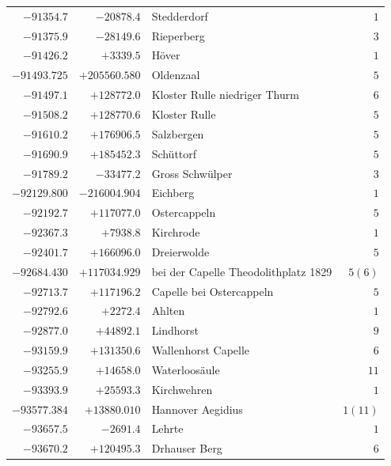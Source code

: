 \begin{center}
\begin{tabular}{r|r|p{170pt}|r}
\(-91354.7\)&\(-20878.4\)&Stedderdorf&\(1\)\\
\(-91375.9\)&\(-28149.6\)&Rieperberg&\(3\)\\
\(-91426.2\)&\(+3339.5\)&Höver&\(1\)\\
\(-91493.725\)&\(+205560.580\)&Oldenzaal&\(5\)\\
\(-91497.1\)&\(+128772.0\)&Kloster Rulle niedriger Thurm&\(6\)\\
\(-91508.2\)&\(+128770.6\)&Kloster Rulle&\(5\)\\
\(-91610.2\)&\(+176906.5\)&Salzbergen&\(5\)\\
\(-91690.9\)&\(+185452.3\)&Schüttorf&\(5\)\\
\(-91789.2\)&\(-33477.2\)&Gross Schwülper&\(3\)\\
\(-92129.800\)&\(-216004.904\)&Eichberg&\(1\)\\
\(-92192.7\)&\(+117077.0\)&Ostercappeln&\(5\)\\
\(-92367.3\)&\(+7938.8\)&Kirchrode&\(1\)\\
\(-92401.7\)&\(+166096.0\)&Dreierwolde&\(5\)\\
\(-92684.430\)&\(+117034.929\)&bei der Capelle Theodolithplatz 1829&\(5 (6)\)\\
\(-92713.7\)&\(+117196.2\)&Capelle bei Ostercappeln&\(5\)\\
\(-92792.6\)&\(+2272.4\)&Ahlten&\(1\)\\
\(-92877.0\)&\(+44892.1\)&Lindhorst&\(9\)\\
\(-93159.9\)&\(+131350.6\)&Wallenhorst Capelle&\(6\)\\
\(-93255.9\)&\(+14658.0\)&Waterloosäule&\(11\)\\
\(-93393.9\)&\(+25593.3\)&Kirchwehren&\(1\)\\
\(-93577.384\)&\(+13880.010\)&Hannover Aegidius&\(1(11)\)\\
\(-93657.5\)&\(-2691.4\)&Lehrte&\(1\)\\
\(-93670.2\)&\(+120495.3\)&Drhauser Berg&\(6\)\\
\hline\end{tabular}\endgroup\end{center}
\clearpage
